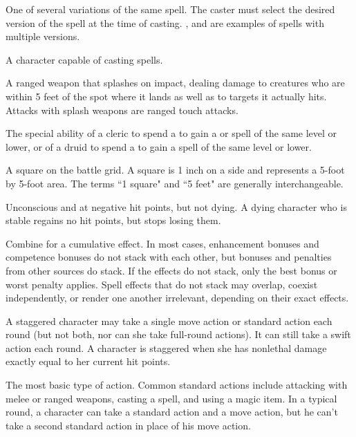 One of several variations of the same spell. The 
caster must select the desired version of the spell at the time of 
casting.  ,   and   are examples of 
spells with multiple versions. 

 A character capable of casting spells. 

 A ranged 
weapon that splashes on impact, 
dealing damage to creatures who are 
within 5 feet of the spot where it lands as well as to targets it actually 
hits. Attacks with splash weapons are ranged touch attacks. 

 The special ability of a cleric to spend a 
 to gain a  or  spell of 
the same level or lower, or of a druid to spend a  to gain 
a  spell of the same level or lower.

 A square on the battle grid. A square is 1 inch on a side 
and represents a 5-foot by 5-foot area. The terms ``1 square" and ``5 
feet" are generally interchangeable. 

 Unconscious and at negative hit points, but not dying. A dying character who is stable regains no hit points, but stops losing them.

 Combine for a cumulative effect. In most cases, enhancement bonuses and competence bonuses do not stack with each other, but bonuses and penalties from other sources do stack. If the effects do not stack, only the best bonus or worst penalty 
applies. Spell effects that do 
not stack may overlap, coexist independently, or render one another 
irrelevant, depending on their exact effects. 

 A staggered character may take a single move action or 
standard action each round (but not both, nor can she take full-round actions). It can still take a swift action each round. A character is staggered when she has nonlethal damage exactly equal to her current hit points.

 The most basic type of action. Common 
standard actions include attacking with melee or ranged weapons, casting a 
spell, and using a magic item. In a typical round, a character can take 
a standard action and a move action, but he can't take a second 
standard action in place of his move action. 

